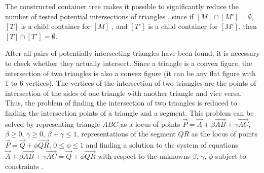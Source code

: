 \documentclass[
11pt,%
tightenlines,%
twoside,%
onecolumn,%
nofloats,%
nobibnotes,%
nofootinbib,%
superscriptaddress,%
noshowpacs,%
centertags]%
{revtex4-2}
\begin{document}
The constructed container tree makes it possible to significantly reduce the number of tested potential intersections of triangles \cite{Jung}, since if $[M] \cap [M'] = \emptyset$, $[T]$ is a child container for $[M]$ , and $[T']$ is a child container for $[M']$, then $[T] \cap [T'] = \emptyset$.

After all pairs of potentially intersecting triangles have been found, it is necessary to check whether they actually intersect.
Since a triangle is a convex figure, the intersection of two triangles is also a convex figure (it can be any flat figure with 1 to 6 vertices).
The vertices of the intersection of two triangles are the points of intersection of the sides of one triangle with another triangle and vice versa.
Thus, the problem of finding the intersection of two triangles is reduced to finding the intersection points of a triangle and a segment.
This problem can be solved by representing triangle $ABC$ as a locus of points $\vec{P} = \vec{A} + \beta \vec{AB} + \gamma \vec{AC}$, $\beta \ge 0$, $\gamma \ge 0$, $\beta + \gamma \le 1$, representations of the segment $QR$ as the locus of points $\vec{P} = \vec{Q} + \phi \vec{QR}$, $0 \le \phi \le 1$ and finding a solution to the system of equations $\vec{A} + \beta \vec{AB} + \gamma \vec{AC} = \vec{Q} + \phi \vec{QR}$ with respect to the unknowns $\beta$, $\gamma$, $\phi$ subject to constraints \cite{Freylekhman}.
\end{document}
